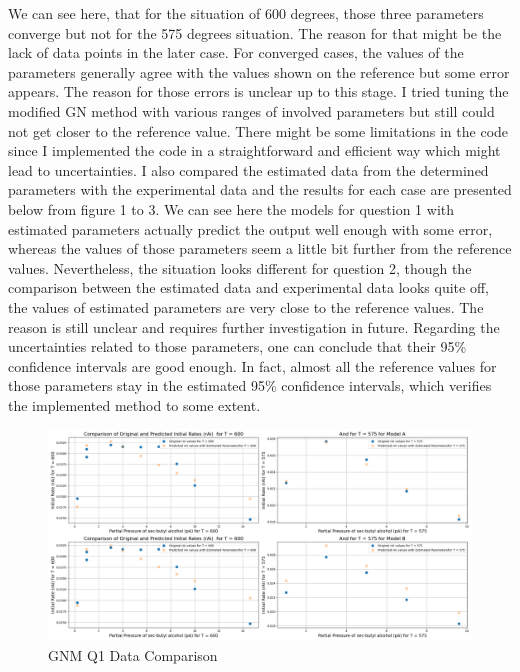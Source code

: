 \documentclass[a4paper,12pt]{article} %
\begin{document}
\clearpage
We can see here, that for the situation of 600 degrees, those three parameters converge but not for the 575 degrees situation.
The reason for that might be the lack of data points in the later case. For converged cases, the values of the parameters
generally agree with the values shown on the reference but some error appears. The reason for those errors is unclear up to this 
stage. I tried tuning the modified GN method with various ranges of involved parameters but still could not get closer to the reference
value. There might be some limitations in the code since I implemented the code in a straightforward and efficient way which might lead to 
uncertainties. I also compared the estimated data from the determined parameters with the experimental data and the results for each case
are presented below from figure 1 to 3. We can see here the models for question 1 with estimated parameters actually predict the output well enough with
some error, whereas the values of those parameters seem a little bit further from the reference values. Nevertheless, the situation
looks different for question 2, though the comparison between the estimated data and experimental data looks quite off, the values
of estimated parameters are very close to the reference values. The reason is still unclear and requires further investigation in future.
Regarding the uncertainties related to those parameters, one can conclude that their 95\% confidence intervals are good enough. In fact, almost all the 
reference values for those parameters stay in the estimated 95\% confidence intervals, which verifies the implemented method to some extent.
\begin{figure}[ht]
    \centering
    \includegraphics[width=1\textwidth]{GNM_Q1_ParamComp.png}
    \caption{GNM Q1 Data Comparison}
\end{figure}
\end{document}
